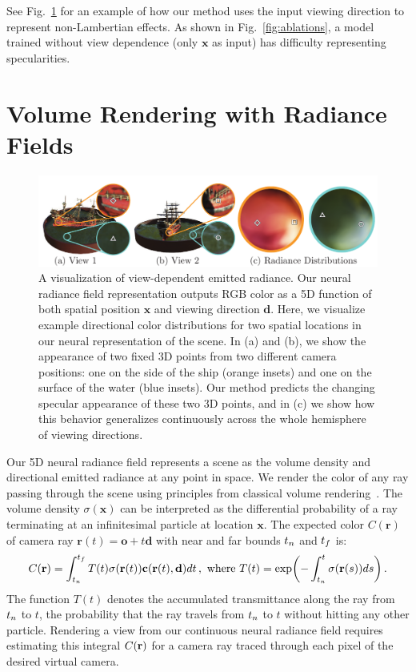 \documentclass[runningheads]{llncs}
\begin{document}
See Fig.~\ref{fig:viewdirs} for an example of how our method uses the input viewing direction to represent non-Lambertian effects.
As shown in Fig.~\ref{fig:ablations}, a model trained without view dependence (only $\mathbf x$ as input) has difficulty representing specularities.




\section{Volume Rendering with Radiance Fields}
\label{sec:rendering}

\begin{figure}[t]
\centering
\includegraphics[width=\linewidth]{figs/viewdirs_small.pdf}
\caption{A visualization of view-dependent emitted radiance. Our neural radiance field representation outputs RGB color as a 5D function of both spatial position $\mathbf x$ and viewing direction $\mathbf d$. Here, we visualize example directional color distributions for two spatial locations in our neural representation of the  scene. 
In (a) and (b), we show the appearance of two fixed 3D points from two different camera positions: one on the side of the ship (orange insets) and one on the surface of the water (blue insets).
Our method predicts the changing specular appearance of these two 3D points, and in (c) we show how this behavior generalizes continuously across the whole hemisphere of viewing directions.
}
\label{fig:viewdirs}
\end{figure}


Our 5D neural radiance field represents a scene as the volume density and directional emitted radiance at any point in space. We render the color of any ray passing through the scene using principles from classical volume rendering~\cite{kajiya84}. The volume density $\sigma(\mathbf{x})$ can be interpreted as the differential probability of a ray terminating at an infinitesimal particle at location $\mathbf{x}$. The expected color $C(\mathbf{r})$ of camera ray $\mathbf{r}(t)=\mathbf{o} + t\mathbf{d}$ with near and far bounds $t_n$ and $t_f$ is: 
\begin{equation}
\Ctrue = \int_{\timenear}^{\timefar}T(t)\absrp(\mathbf{r}(t))\mathbf{c}(\mathbf{r}(t),\mathbf{d})dt\,, \textrm{ where }
T(t) = \expo{-\int_{\timenear}^{t}\absrp(\mathbf{r}(s))ds}\,.
\end{equation}
The function $T(t)$ denotes the accumulated transmittance along the ray from $t_n$ to $t$, \ie the probability that the ray travels from $t_n$ to $t$ without hitting any other particle. Rendering a view from our continuous neural radiance field requires estimating this integral $C(\mathbf{r})$ for a camera ray traced through each pixel of the desired virtual camera.
\end{document}
